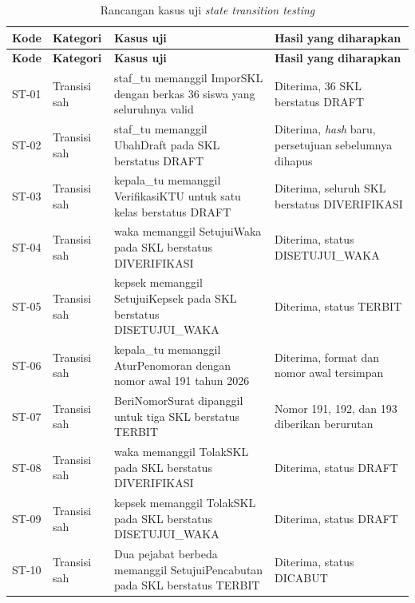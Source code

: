 \begingroup
\setlength{\tabcolsep}{3pt}
\renewcommand{\arraystretch}{1.2}
\footnotesize
\begin{longtable}{|>{\raggedright\arraybackslash}p{}|>{\raggedright\arraybackslash}p{}|>{\raggedright\arraybackslash}p{}|>{\raggedright\arraybackslash}p{}|}
    \caption{Rancangan kasus uji \textit{state transition testing}}
    \label{table:3.st}\\
    \hline
    \textbf{Kode} & \textbf{Kategori} & \textbf{Kasus uji} & \textbf{Hasil yang diharapkan} \\
    \hline
    \endfirsthead
    \hline
    \textbf{Kode} & \textbf{Kategori} & \textbf{Kasus uji} & \textbf{Hasil yang diharapkan} \\
    \hline
    \endhead
    ST-01 & Transisi sah & staf\_tu memanggil ImporSKL dengan berkas 36 siswa yang seluruhnya valid & Diterima, 36 SKL berstatus DRAFT \\ \hline
    ST-02 & Transisi sah & staf\_tu memanggil UbahDraft pada SKL berstatus DRAFT & Diterima, \textit{hash} baru, persetujuan sebelumnya dihapus \\ \hline
    ST-03 & Transisi sah & kepala\_tu memanggil VerifikasiKTU untuk satu kelas berstatus DRAFT & Diterima, seluruh SKL berstatus DIVERIFIKASI \\ \hline
    ST-04 & Transisi sah & waka memanggil SetujuiWaka pada SKL berstatus DIVERIFIKASI & Diterima, status DISETUJUI\_\allowbreak WAKA \\ \hline
    ST-05 & Transisi sah & kepsek memanggil SetujuiKepsek pada SKL berstatus DISETUJUI\_\allowbreak WAKA & Diterima, status TERBIT \\ \hline
    ST-06 & Transisi sah & kepala\_tu memanggil AturPenomoran dengan nomor awal 191 tahun 2026 & Diterima, format dan nomor awal tersimpan \\ \hline
    ST-07 & Transisi sah & BeriNomorSurat dipanggil untuk tiga SKL berstatus TERBIT & Nomor 191, 192, dan 193 diberikan berurutan \\ \hline
    ST-08 & Transisi sah & waka memanggil TolakSKL pada SKL berstatus DIVERIFIKASI & Diterima, status DRAFT \\ \hline
    ST-09 & Transisi sah & kepsek memanggil TolakSKL pada SKL berstatus DISETUJUI\_\allowbreak WAKA & Diterima, status DRAFT \\ \hline
    ST-10 & Transisi sah & Dua pejabat berbeda memanggil SetujuiPencabutan pada SKL berstatus TERBIT & Diterima, status DICABUT \\ \hline

\end{longtable}
